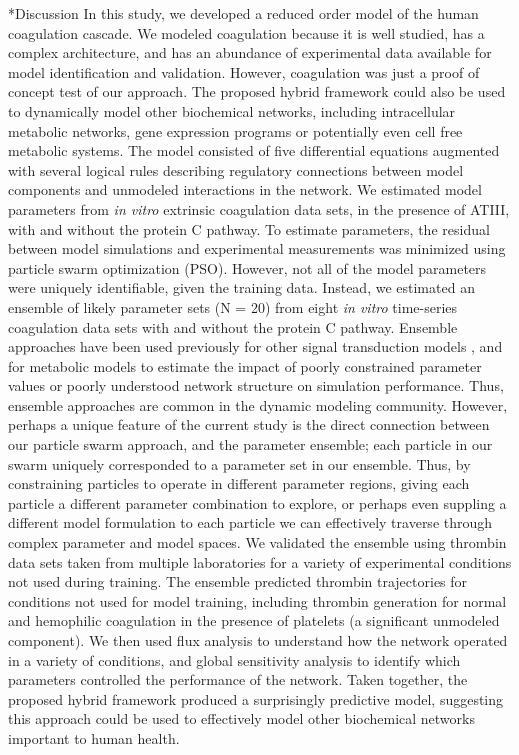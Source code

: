 \documentclass[12pt]{article}
\makeatletter
\renewcommand\section{\@startsection
	{subsection}{2}{0mm}
	{-0.2in}
	{0.05\baselineskip}
	{\normalfont\large\bfseries}}
\makeatother
\begin{document}
\section*{Discussion}
In this study, we developed a reduced order model of the human coagulation cascade.
We modeled coagulation because it is well studied, has a complex architecture, 
and has an abundance of experimental data available for model identification and validation. 
However, coagulation was just a proof of concept test of our approach. 
The proposed hybrid framework could also be used to dynamically model other biochemical networks, including intracellular metabolic networks, gene expression programs 
or potentially even cell free metabolic systems. 
The model consisted of five differential equations augmented with several logical rules describing 
regulatory connections between model components and unmodeled interactions in the network. 
We estimated model parameters from \textit{in vitro} extrinsic coagulation data sets, in the presence of ATIII, with and without the protein C pathway. 
To estimate parameters, the residual between model simulations and experimental measurements was minimized using particle swarm optimization (PSO). 
However, not all of the model parameters were uniquely identifiable, given the training data.
Instead, we estimated an ensemble of likely parameter sets (N = 20)
from eight \emph{in vitro} time-series coagulation data sets with and without the protein C pathway.
Ensemble approaches have been used previously for other signal transduction models \citep{Kuepfer:2007aa,Song:2009aa,2010_song_varner_BiotechJ,Tasseff:2010aa,Lequieu:2011aa}, 
and for metabolic models \citep{Tran:2008aa} to 
estimate the impact of poorly constrained parameter values or poorly understood network structure on simulation performance. 
Thus, ensemble approaches are common in the dynamic modeling community. 
However, perhaps a unique feature of the current study is the direct connection between our particle swarm approach, 
and the parameter ensemble; each particle in our swarm uniquely corresponded to a parameter set in our ensemble. 
Thus, by constraining particles to operate in different parameter regions, giving each particle a different parameter combination to explore, 
or perhaps even suppling a different model formulation to each particle we can effectively 
traverse through complex parameter and model spaces. 
We validated the ensemble using thrombin data sets taken from multiple laboratories for a variety of experimental conditions not used during training. 
The ensemble predicted thrombin trajectories for conditions not used for model training, including thrombin generation for normal and hemophilic coagulation 
in the presence of platelets (a significant unmodeled component).
We then used flux analysis to understand how the network operated in a variety of conditions, and global sensitivity analysis to identify which parameters controlled the 
performance of the network. Taken together, the proposed hybrid framework produced a surprisingly predictive model, suggesting this approach could 
be used to effectively model other biochemical networks important to human health. 
\end{document}
